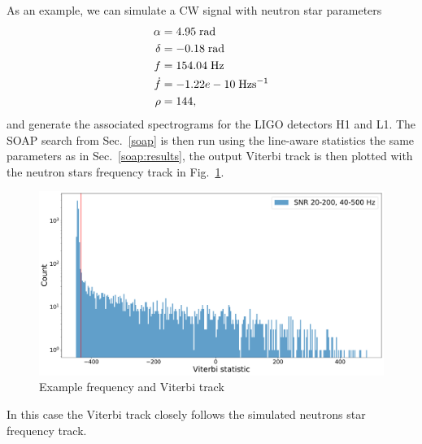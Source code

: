 As an example, we can simulate a \gls{CW} signal with neutron star parameters 
\begin{equation}
    \begin{split}
        \alpha &= 4.95 \; \rm{rad}\\
        \delta &= -0.18 \; \rm{rad} \\
        f &= 154.04 \; \rm{Hz}\\
        \dot{f} &= -1.22e-10 \; \rm{Hz s^{-1}}\\
        \rho &= 144,\\
    \end{split}
\end{equation}
and generate the associated spectrograms for the \gls{LIGO} detectors H1 and L1.
The SOAP search from Sec.~\ref{soap} is then run using the line-aware statistics the same parameters as in Sec.~\ref{soap:results}, the output Viterbi track is then plotted with the neutron stars frequency track in Fig.~\ref{par_est:results:freqtrack}.
%
\begin{figure}[pt]

    \centering
    \includegraphics[width=\linewidth]{C5_parameter/viterbi_hist.pdf}
    \caption[Frequency track of injected signal]{ Example frequency and Viterbi track }
    \label{par_est:results:freqtrack}
    
\end{figure}
%
In this case the Viterbi track closely follows the simulated neutrons star frequency track.

